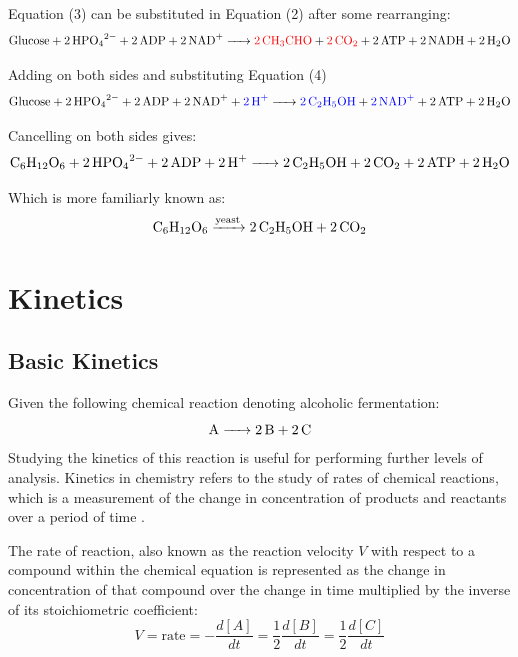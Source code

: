 \documentclass{article}
\begin{document}
Equation (3) can be substituted in Equation (2) after some rearranging:
\begin{equation*}
    \ce{Glucose + 2HPO_{4}^{2-} + 2ADP + 2NAD+ -> \textcolor{red}{\ce{2CH3CHO}} + \textcolor{red}{\ce{2CO2}} + 2ATP + 2NADH + 2H2O}
\end{equation*}

Adding  on both sides and substituting Equation (4)
\begin{equation*}
    \ce{Glucose + 2HPO_{4}^{2-} + 2ADP + 2NAD+ + \textcolor{blue}{\ce{2H+}} -> \textcolor{blue}{\ce{2C2H5OH}} + \textcolor{blue}{\ce{2NAD+}} + 2ATP + 2H2O}
\end{equation*}

Cancelling  on both sides gives:
\begin{equation}
    \ce{C6H12O6 + 2HPO_{4}^{2-} + 2ADP + 2H+ -> 2C2H5OH + 2CO2 + 2ATP + 2H2O}
\end{equation}

Which is more familiarly known as:
\begin{equation}
    \ce{C6H12O6 ->[yeast] 2C2H5OH + 2CO2}
\end{equation}

\section{Kinetics}  %

\subsection{Basic Kinetics}
Given the following chemical reaction denoting alcoholic fermentation:
\begin{equation}
    \ce{A -> 2B + 2C}
\end{equation}
Studying the kinetics of this reaction is useful for performing further levels of analysis. Kinetics in chemistry refers to the study of rates of chemical reactions, which is a measurement of the change in concentration of products and reactants over a period of time \parencite{ref}.

\medskip

The rate of reaction, also known as the reaction velocity $V$ with respect to a compound within the chemical equation is represented as the change in concentration of that compound over the change in time multiplied by the inverse of its stoichiometric coefficient:
\begin{equation}
    V = \text{rate} = -\frac{d[A]}{dt} = \frac{1}{2}\frac{d[B]}{dt} = \frac{1}{2}\frac{d[C]}{dt}
\end{equation}
\end{document}
